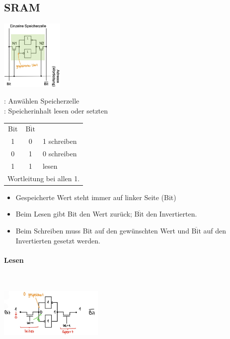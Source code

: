 \subsection{SRAM}
\begin{center}
    \begin{minipage}{0.45\linewidth}
        \includegraphics[width = 30mm]{images/sram_store.JPG}
    \end{minipage}
    \hfill
    \begin{minipage}{0.5\linewidth}
        : Anwählen Speicherzelle\\
        : Speicherinhalt lesen oder setzten
        \begin{center}
            \begin{tabular}{c c l}
                Bit & $\overline{\text{Bit}}$ & \\
                1 & 0 & 1 schreiben\\
                0 & 1 & 0 schreiben\\
                1 & 1 & lesen\\
                \multicolumn{3}{l}{Wortleitung bei allen 1.}
            \end{tabular}
        \end{center}
    \end{minipage}
\end{center}
\begin{itemize}
    \item Gespeicherte Wert steht immer auf linker Seite (Bit)
    \item Beim Lesen gibt Bit den Wert zurück; $\overline{\text{Bit}}$ den Invertierten.
    \item Beim Schreiben muss Bit auf den gewünschten Wert und $\overline{\text{Bit}}$ auf den Invertierten gesetzt werden.
\end{itemize}
\paragraph{Lesen}\mbox{}\\
\begin{center}
    \includegraphics[width = 50mm]{images/sram_read.JPG}
\end{center}
